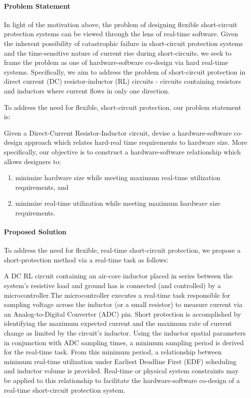 \paragraph{Problem Statement}
In light of the motivation above, the problem of designing flexible short-circuit protection systems can be viewed through the lens of real-time software.
Given the inherent possibility of catastrophic failure in short-circuit protection systems and the time-sensitive nature of current rise during short-circuits, we seek to frame the problem as one of hardware-software co-design via hard real-time systems.
Specifically, we aim to address the problem of short-circuit protection in direct current (DC) resistor-inductor (RL) circuits - circuits containing resistors and inductors where current flows in only one direction.

To address the need for flexible, short-circuit protection, our problem statement is:

\noindent Given a Direct-Current Resistor-Inductor circuit, devise a hardware-software co-design approach which relates hard-real time requirements to hardware size. More specifically, our objective is to construct a hardware-software relationship which allows designers to:
\begin{enumerate}
    \item minimize hardware size while meeting maximum real-time utilization requirements, and
    \item minimize real-time utilization while meeting maximum hardware size requirements.
\end{enumerate}

\paragraph{Proposed Solution}
To address the need for flexible, real-time short-circuit protection, we propose a short-protection method via a real-time task as follows:

A DC RL circuit containing an air-core inductor placed in series between the system's resistive load and ground has is connected (and controlled) by a microcontroller.The microcontroller executes a real-time task responsible for sampling voltage across the inductor (or a small resistor) to measure current via an Analog-to-Digital Converter (ADC) pin. Short protection is accomplished by identifying the maximum expected current and the maximum rate of current change as limited by the circuit's inductor. Using the inductor spatial parameters in conjunction with ADC sampling times, a minimum sampling period is derived for the real-time task. From this minimum period, a relationship between minimum real-time utilization under Earliest Deadline First (EDF) scheduling and inductor volume  is provided. Real-time or physical system constraints may be applied to this relationship to facilitate the hardware-software co-design of a real-time short-circuit protection system.

